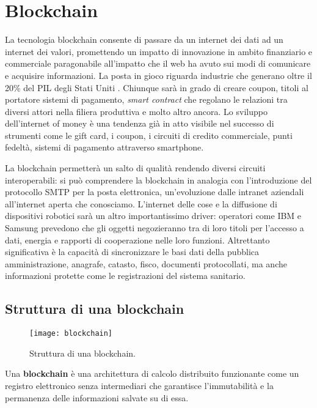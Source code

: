 \chapter{Blockchain}

La tecnologia blockchain consente di passare da un internet dei dati ad un internet dei valori, promettendo un impatto di innovazione in ambito
finanziario e commerciale paragonabile all’impatto che il web ha avuto sui modi di comunicare e acquisire informazioni.
La posta in gioco riguarda industrie che generano oltre il 20\% del PIL degli Stati Uniti \cite{WEBSITE:6}. Chiunque sarà in grado di creare coupon,
titoli al portatore sistemi di pagamento, \emph{smart contract} che regolano le relazioni tra diversi attori nella filiera produttiva e molto altro ancora.
Lo sviluppo dell’internet of money è una tendenza già in atto visibile nel successo di strumenti come le gift card, i coupon, i circuiti di credito commerciale,
punti fedeltà, sistemi di pagamento attraverso smartphone.

La blockchain permetterà un salto di qualità rendendo diversi circuiti interoperabili: si può comprendere la blockchain
in analogia con l’introduzione del protocollo SMTP per la posta elettronica, un’evoluzione dalle intranet aziendali all’internet aperta che conosciamo.
L’internet delle cose e la diffusione di dispositivi robotici sarà un altro importantissimo driver: operatori come IBM e Samsung prevedono 
che gli oggetti negozieranno tra di loro titoli per l’accesso a dati, energia e rapporti di cooperazione nelle loro funzioni. \cite{WEBSITE:7}
Altrettanto significativa è la capacità di sincronizzare le basi dati della pubblica amministrazione, anagrafe, catasto, fisco,
documenti protocollati, ma anche informazioni protette come le registrazioni del sistema sanitario.

\section{Struttura di una blockchain}

\begin{figure}[h!]
    \texttt{[image: blockchain]}
    \caption{Struttura di una blockchain.}
    \label{fig:blockchain}
\end{figure}

Una \textbf{blockchain} è una architettura di calcolo distribuito funzionante come un registro elettronico senza intermediari
che garantisce l’immutabilità e la permanenza delle informazioni salvate su di essa.

